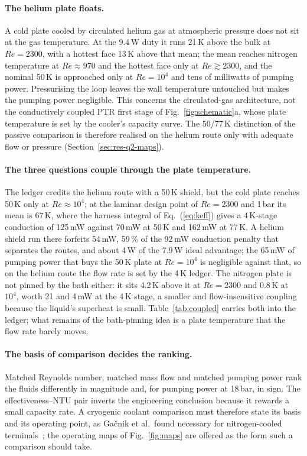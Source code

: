 \documentclass[preprint,12pt]{elsarticle}
\renewcommand{\Re}{\mathit{Re}}
\begin{document}
\paragraph{The helium plate floats.} A cold plate cooled by circulated helium gas at
atmospheric pressure does not sit at the gas temperature. At the 9.4\,W duty it runs 21\,K
above the bulk at $\Re=2300$, with a hottest face 13\,K above that mean; the mean reaches
nitrogen temperature at $\Re\approx970$ and the hottest face only at $\Re\gtrsim2300$, and the
nominal 50\,K is approached only at $\Re=10^4$ and tens of milliwatts of pumping power.
Pressurising the loop leaves the wall temperature untouched but makes the pumping power
negligible. This concerns the circulated-gas architecture, not the conductively coupled PTR
first stage of Fig.~\ref{fig:schematic}a, whose plate temperature is set by the cooler's
capacity curve. The 50/77\,K distinction of the passive comparison is therefore realised on
the helium route only with adequate flow or pressure (Section~\ref{sec:res-q2-maps}).

\paragraph{The three questions couple through the plate temperature.} The ledger credits the
helium route with a 50\,K shield, but the cold plate reaches 50\,K only at $\Re\approx10^4$;
at the laminar design point of $\Re=2300$ and 1\,bar its mean is 67\,K, where the harness
integral of Eq.~(\ref{eq:keff}) gives a 4\,K-stage conduction of 125\,mW against 70\,mW at
50\,K and 162\,mW at 77\,K. A helium shield run there forfeits 54\,mW, 59\,\% of the 92\,mW
conduction penalty that separates the routes, and about 4\,W of the 7.9\,W ideal advantage;
the 65\,mW of pumping power that buys the 50\,K plate at $\Re=10^4$ is negligible against
that, so on the helium route the flow rate is set by the 4\,K ledger. The nitrogen plate is
not pinned by the bath either: it sits 4.2\,K above it at $\Re=2300$ and 0.8\,K at $10^4$,
worth 21 and 4\,mW at the 4\,K stage, a smaller and flow-insensitive coupling because the
liquid's superheat is small. Table~\ref{tab:coupled} carries both into the ledger; what
remains of the bath-pinning idea is a plate temperature that the flow rate barely moves.

\paragraph{The basis of comparison decides the ranking.} Matched Reynolds number, matched mass
flow and matched pumping power rank the fluids differently in magnitude and, for pumping
power at 18\,bar, in sign. The effectiveness--NTU pair inverts the engineering conclusion
because it rewards a small capacity rate. A cryogenic coolant comparison must therefore state
its basis and its operating point, as Gačnik et al.\ found necessary for nitrogen-cooled
terminals~\cite{Gacnik2025LN2Terminals}; the operating maps of Fig.~\ref{fig:maps} are offered
as the form such a comparison should take.
\end{document}
